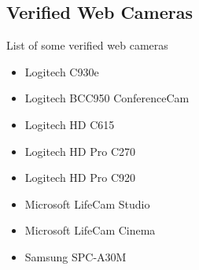 \begin{appendices}
\chapter{Verified Web Cameras} 


List of some verified web cameras \parencite{camerafi}

\begin{itemize}
\item Logitech  C930e
\item Logitech BCC950 ConferenceCam
\item Logitech HD  C615
\item Logitech HD Pro  C270
\item Logitech HD Pro  C920
\item Microsoft LifeCam Studio
\item Microsoft LifeCam Cinema
\item Samsung SPC-A30M
\end{itemize}

\end{appendices}
